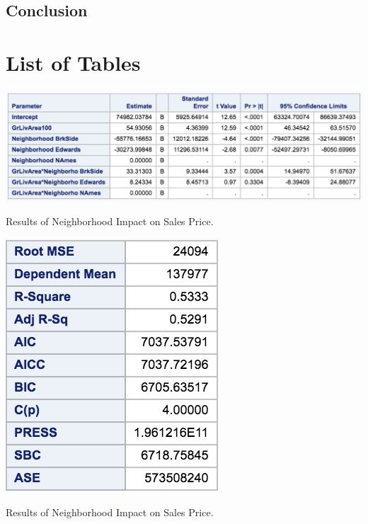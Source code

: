 \documentclass[11pt]{scrartcl} %
\begin{document}

\subsection{Conclusion}


\appendix{} 
\pagebreak
\section{List of Tables}
\label{sec:Tables}
\hrulefill
\begin{table}[H] %
	\centering %
	\includegraphics[scale=.3]{../graphics/A1NHcomp}
	\caption{Results of Neighborhood Impact on Sales Price.}
	\label{tab:SMM}
\end{table}
\hrulefill
\begin{table}[H] %
	\centering %
	\includegraphics[scale=.4]{../graphics/A1NBMLRResults}
	\caption{Results of Neighborhood Impact on Sales Price.}
	\label{tab:A1Results}
\end{table}
\end{document}
